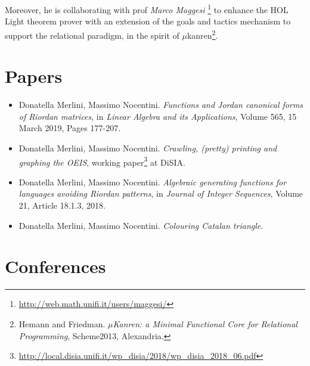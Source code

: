 \documentclass[a4paper]{tufte-handout}
\begin{document}
    Moreover, he is collaborating with prof \textit{Marco Maggesi}
    \footnote{\url{http://web.math.unifi.it/users/maggesi/}} to enhance the HOL
    Light theorem prover with an extension of the goals and tactics mechanism
    to support the relational paradigm, in the spirit of
    $\mu$kanren\footnote{Hemann and Friedman. \textit{$\mu$Kanren: a Minimal Functional
    Core for Relational Programming}, Scheme2013, Alexandria.}.

    \section{Papers}

    \begin{itemize}

        \item Donatella Merlini, Massimo Nocentini. \emph{Functions and Jordan canonical forms of Riordan matrices},
        in \textit{Linear Algebra and its Applications}, Volume 565, 15 March 2019, Pages 177-207.

        \item Donatella Merlini, Massimo Nocentini. \emph{Crawling, (pretty) printing and graphing the OEIS}, 
        working paper\footnote{\url{http://local.disia.unifi.it/wp_disia/2018/wp_disia_2018_06.pdf}} at DiSIA.

        \item Donatella Merlini, Massimo Nocentini. \emph{Algebraic generating functions for languages
            avoiding Riordan patterns}, in \textit{Journal of Integer Sequences}, Volume 21, Article 18.1.3, 2018.

        \item Donatella Merlini, Massimo Nocentini. \emph{Colouring Catalan triangle}.

    \end{itemize}
    
    \section{Conferences}
\end{document}
